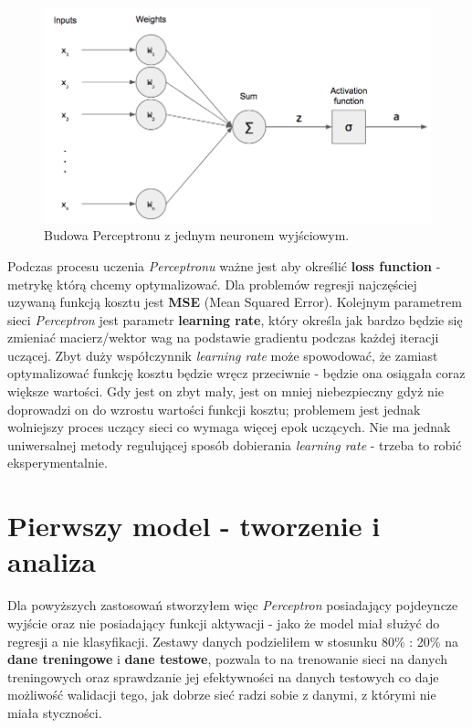\documentclass[12pt]{aghdpl}
\newenvironment{tightcenter}{
  \setlength\topsep{0pt}
  \setlength\parskip{0pt}
  \begin{center}
}{
  \end{center}
}
\begin{document}
		\begin{figure}[h]
	 		\begin{tightcenter}
	 			\includegraphics[width = 0.75\linewidth]{rysunki/perceptron.png}
			\end{tightcenter}	 			
	 			
 			\caption{Budowa Perceptronu z jednym neuronem wyjściowym.}
			\label{fig: budowa_perceptronu}
		\end{figure}

		Podczas procesu uczenia \textit{Perceptronu} ważne jest aby określić \textbf{loss function} - metrykę którą chcemy optymalizować. Dla problemów regresji najczęściej uzywaną funkcją kosztu jest \textbf{MSE} (Mean Squared Error). Kolejnym parametrem sieci \textit{Perceptron} jest parametr \textbf{learning rate}, który określa jak bardzo będzie się zmieniać macierz/wektor wag na podstawie gradientu podczas każdej iteracji uczącej. Zbyt duży współczynnik \textit{learning rate} może spowodować, że zamiast optymalizować funkcję kosztu będzie wręcz przeciwnie - będzie ona osiągała coraz większe wartości. Gdy jest on zbyt mały, jest on mniej niebezpieczny gdyż nie doprowadzi on do wzrostu wartości funkcji kosztu; problemem jest jednak wolniejszy proces uczący sieci co wymaga więcej epok uczących. Nie ma jednak uniwersalnej metody regulującej sposób dobierania \textit{learning rate} - trzeba to robić eksperymentalnie.
		
		\section{Pierwszy model - tworzenie i analiza} \label{pierwszy_model_tworzenie_i_analiza}
		Dla powyższych zastosowań stworzyłem więc \textit{Perceptron} posiadający pojdeyncze wyjście oraz nie posiadający funkcji aktywacji - jako że model miał służyć do regresji a nie klasyfikacji. Zestawy danych podzieliłem w stosunku 80\% : 20\% na \textbf{dane treningowe} i \textbf{dane testowe}, pozwala to na trenowanie sieci na danych treningowych oraz sprawdzanie jej efektywności na danych testowych co daje możliwość walidacji tego, jak dobrze sieć radzi sobie z danymi, z którymi nie miała styczności.
		
\end{document}
